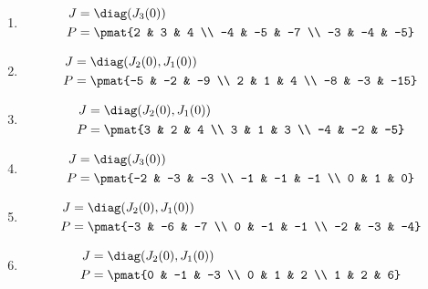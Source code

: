 \begin{enumerate}
\item

\begin{align*}
J &= \diag(J_{3}(0))\\
P &= \pmat{2 & 3 & 4 \\ -4 & -5 & -7 \\ -3 & -4 & -5}
\end{align*}

\item

\begin{align*}
J &= \diag(J_{2}(0), J_{1}(0))\\
P &= \pmat{-5 & -2 & -9 \\ 2 & 1 & 4 \\ -8 & -3 & -15}
\end{align*}

\item

\begin{align*}
J &= \diag(J_{2}(0), J_{1}(0))\\
P &= \pmat{3 & 2 & 4 \\ 3 & 1 & 3 \\ -4 & -2 & -5}
\end{align*}

\item

\begin{align*}
J &= \diag(J_{3}(0))\\
P &= \pmat{-2 & -3 & -3 \\ -1 & -1 & -1 \\ 0 & 1 & 0}
\end{align*}

\item

\begin{align*}
J &= \diag(J_{2}(0), J_{1}(0))\\
P &= \pmat{-3 & -6 & -7 \\ 0 & -1 & -1 \\ -2 & -3 & -4}
\end{align*}

\item

\begin{align*}
J &= \diag(J_{2}(0), J_{1}(0))\\
P &= \pmat{0 & -1 & -3 \\ 0 & 1 & 2 \\ 1 & 2 & 6}
\end{align*}


\end{enumerate}
